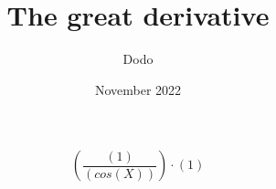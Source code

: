 \documentclass{article}
\title{The great derivative}
\author{Dodo}
\date{November 2022}
\begin{document}
    \maketitle
    \[{({\frac{({1})}{({cos({X})})}})\cdot({1})}\]

	
\end{document}
